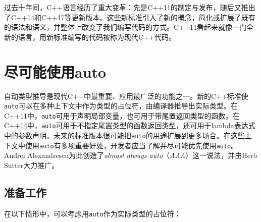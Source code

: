 
过去十年间，C++语言经历了重大变革：先是C++11的制定与发布，随后又推出了C++14和C++17等更新版本。这些新标准引入了新的概念，简化或扩展了既有的语法和语义，并整体上改变了我们编写代码的方式。C++11看起来就像一门全新的语言，用新标准编写的代码被称为现代C++代码。



\section{尽可能使用auto}



自动类型推导是现代C++中最重要、应用最广泛的功能之一。新的C++标准使\texttt{auto}可以在多种上下文中作为类型的占位符，由编译器推导出实际类型。在C++11中，\texttt{auto}可用于声明局部变量，也可用于带尾置返回类型的函数。在C++14中，\texttt{auto}可用于不指定尾置类型的函数返回类型，还可用于lambda表达式中的参数声明。未来的标准版本很可能把\texttt{auto}的用途扩展到更多场合。在这些上下文中使用\texttt{auto}有多项重要好处，开发者应当了解并尽可能优先使用\texttt{auto}。Andrei Alexandrescu为此创造了\textit{almost always auto}（\textit{AAA}）这一说法，并由Herb Sutter大力推广。



\subsection{准备工作}



在以下情形中，可以考虑用\texttt{auto}作为实际类型的占位符：



